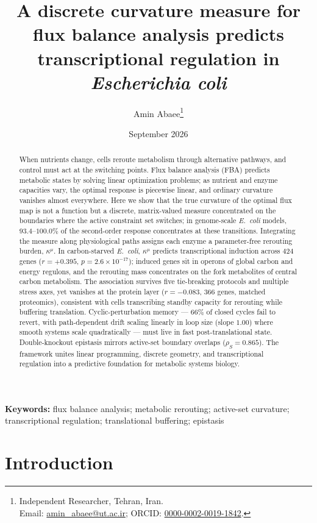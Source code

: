 \documentclass[11pt,a4paper]{article}
\title{A discrete curvature measure for flux balance analysis
       predicts transcriptional regulation in \emph{Escherichia coli}}
\author{Amin Abaee\thanks{Independent Researcher, Tehran, Iran.\\
  Email: \href{mailto:amin_abaee@ut.ac.ir}{amin\_abaee@ut.ac.ir}; ORCID:
  \href{https://orcid.org/0000-0002-0019-1842}{0000-0002-0019-1842}.}}
\date{September 2026}
\theoremstyle{plain}
\theoremstyle{definition}
\theoremstyle{remark}
\newcommand{\kmu}{\kappa^{\mu}}
\begin{document}
\linenumbers
\maketitle

\begin{abstract}
\noindent
When nutrients change, cells reroute metabolism through alternative
pathways, and control must act at the switching points. Flux balance
analysis (FBA) predicts metabolic states by solving linear
optimization problems; as nutrient and enzyme capacities vary, the
optimal response is piecewise linear, and ordinary curvature vanishes
almost everywhere. Here we show that the true curvature of the
optimal flux map is not a function but a discrete, matrix-valued
measure concentrated on the boundaries where the active constraint
set switches; in genome-scale \emph{E.~coli} models, $93.4$--$100.0\%$
of the second-order response concentrates at these transitions.
Integrating the measure along physiological paths assigns each enzyme
a parameter-free rerouting burden, $\kmu$. In carbon-starved
\emph{E.~coli}, $\kmu$ predicts transcriptional induction across
$424$ genes ($r = +0.395$, $p = 2.6 \times 10^{-17}$); induced genes
sit in operons of global carbon and energy regulons, and the
rerouting mass concentrates on the fork metabolites of central carbon
metabolism. The association survives five tie-breaking protocols and
multiple stress axes, yet vanishes at the protein layer
($r = -0.083$, $366$ genes, matched proteomics), consistent with
cells transcribing standby capacity for rerouting while buffering
translation.
Cyclic-perturbation memory --- $66\%$ of closed cycles fail to
revert, with path-dependent drift scaling linearly in loop size
(slope $1.00$) where smooth systems scale quadratically --- must live
in fast post-translational state. Double-knockout epistasis mirrors
active-set boundary overlaps ($\rho_S = 0.865$). The framework
unites linear programming, discrete geometry, and transcriptional
regulation into a predictive foundation for metabolic systems
biology.
\end{abstract}

\medskip
\noindent\textbf{Keywords:} flux balance analysis; metabolic
rerouting; active-set curvature; transcriptional regulation;
translational buffering; epistasis

\bigskip

\section{Introduction}\label{sec:intro}
\end{document}
